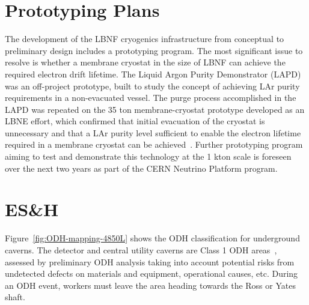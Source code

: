 


\chapter{Prototyping Plans}
\label{sec:cryo-cryosys-proto-plans}


The development of the LBNF cryogenics infrastructure from conceptual 
to preliminary design includes a prototyping program. The most 
significant issue to resolve is whether a membrane cryostat in
the size of LBNF can achieve the required electron drift lifetime. 
The Liquid Argon Purity Demonstrator (LAPD) was an 
off-project prototype, built to study the concept of achieving
LAr purity requirements in a non-evacuated vessel. 
The purge process accomplished in the LAPD was 
repeated on the 35 ton membrane-cryostat prototype 
developed as an LBNE effort, which confirmed that initial 
evacuation of the cryostat is unnecessary and that 
a LAr purity level sufficient to enable the electron lifetime 
required in a membrane cryostat can be achieved~\cite{Montanari:2013/06/13aqa}.
Further prototyping program aiming to test and demonstrate 
this technology at the 1 kton scale is foreseen over the
next two years as part of the CERN Neutrino Platform program.

\chapter{ES\&H}
\label{sec:cryo-cryosys-esh}

Figure~\ref{fig:ODH-mapping-4850L} shows the ODH classification for
underground caverns. The detector and central utility caverns
are Class 1 ODH areas~\cite{feshm},
assessed by preliminary ODH analysis taking into account
potential risks from undetected defects on materials
and equipment, operational causes, etc.
During an ODH event, workers must leave the area heading towards the Ross or Yates shaft.

